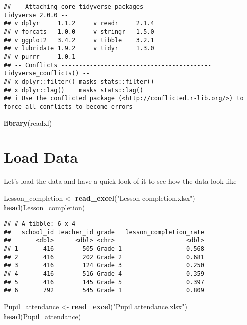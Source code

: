\documentclass[
]{article}
\newenvironment{Shaded}{\begin{snugshade}}{\end{snugshade}}
\newcommand{\FunctionTok}[1]{\textcolor[rgb]{0.13,0.29,0.53}{\textbf{#1}}}
\newcommand{\NormalTok}[1]{#1}
\newcommand{\OtherTok}[1]{\textcolor[rgb]{0.56,0.35,0.01}{#1}}
\newcommand{\StringTok}[1]{\textcolor[rgb]{0.31,0.60,0.02}{#1}}
\begin{document}
\begin{verbatim}
## -- Attaching core tidyverse packages ------------------------ tidyverse 2.0.0 --
## v dplyr     1.1.2     v readr     2.1.4
## v forcats   1.0.0     v stringr   1.5.0
## v ggplot2   3.4.2     v tibble    3.2.1
## v lubridate 1.9.2     v tidyr     1.3.0
## v purrr     1.0.1     
## -- Conflicts ------------------------------------------ tidyverse_conflicts() --
## x dplyr::filter() masks stats::filter()
## x dplyr::lag()    masks stats::lag()
## i Use the conflicted package (<http://conflicted.r-lib.org/>) to force all conflicts to become errors
\end{verbatim}

\begin{Shaded}
\begin{Highlighting}[]
\FunctionTok{library}\NormalTok{(readxl)}
\end{Highlighting}
\end{Shaded}

\hypertarget{load-data}{%
\section{Load Data}\label{load-data}}

Let's load the data and have a quick look of it to see how the data look
like

\begin{Shaded}
\begin{Highlighting}[]
\NormalTok{Lesson\_completion }\OtherTok{\textless{}{-}} \FunctionTok{read\_excel}\NormalTok{(}\StringTok{"Lesson completion.xlsx"}\NormalTok{)}
\FunctionTok{head}\NormalTok{(Lesson\_completion)}
\end{Highlighting}
\end{Shaded}

\begin{verbatim}
## # A tibble: 6 x 4
##   school_id teacher_id grade   lesson_completion_rate
##       <dbl>      <dbl> <chr>                    <dbl>
## 1       416        505 Grade 1                  0.568
## 2       416        202 Grade 2                  0.681
## 3       416        124 Grade 3                  0.250
## 4       416        516 Grade 4                  0.359
## 5       416        145 Grade 5                  0.397
## 6       792        545 Grade 1                  0.809
\end{verbatim}

\begin{Shaded}
\begin{Highlighting}[]
\NormalTok{Pupil\_attendance }\OtherTok{\textless{}{-}} \FunctionTok{read\_excel}\NormalTok{(}\StringTok{"Pupil attendance.xlsx"}\NormalTok{)}
\FunctionTok{head}\NormalTok{(Pupil\_attendance)}
\end{Highlighting}
\end{Shaded}
\end{document}
